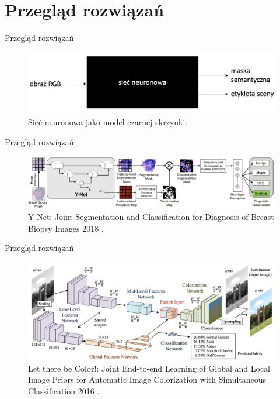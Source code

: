 \documentclass[10pt]{beamer}
\begin{document}
\section[Przegląd rozwiązań]{Przegląd rozwiązań}
\begin{frame}{Przegląd rozwiązań}
    \begin{figure}
        \includegraphics[width=\textwidth]{images/blackbox.png}
        \caption{Sieć neuronowa jako model czarnej skrzynki.}
    \end{figure}
\end{frame}
\begin{frame}{Przegląd rozwiązań}
    \begin{figure}
        \includegraphics[width=\textwidth]{images/y-net.png}
        \caption{Y-Net: Joint Segmentation and Classification for Diagnosis of Breast Biopsy Images 2018 \cite{mehta2018net}.}
    \end{figure}
\end{frame}
\begin{frame}{Przegląd rozwiązań}
    \begin{figure}
        \includegraphics[width=\textwidth]{images/global-local-features.png}
        \caption{Let there be Color!: Joint End-to-end Learning of Global and Local Image Priors for Automatic Image Colorization with Simultaneous Classification 2016 \cite{iizuka2016let}.}
    \end{figure}
\end{frame}
\end{document}
